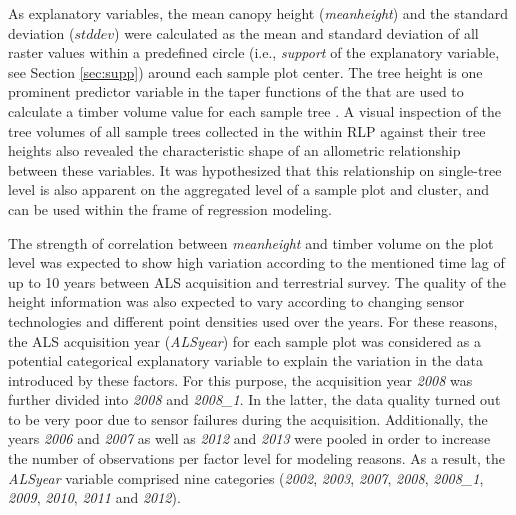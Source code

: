 As explanatory variables, the mean canopy height (\textit{meanheight}) and the standard deviation ($stddev$) were calculated as the mean and standard deviation of all raster values within a predefined circle (i.e., \textit{support} of the explanatory variable, see Section \ref{sec:supp}) around each sample plot center.  The tree height is one prominent predictor variable in the taper functions of the \bwi{} that are used to calculate a timber volume value for each sample tree \citep{kublin2003, kublin2013}. A visual inspection of the tree volumes of all sample trees collected in the \bwi{} within RLP against their tree heights also revealed the characteristic shape of an allometric relationship between these variables. It was hypothesized that this relationship on single-tree level is also apparent on the aggregated level of a sample plot and cluster, and can be used within the frame of regression modeling.\par
The strength of correlation between \textit{meanheight} and timber volume on the plot level was expected to show high variation according to the mentioned time lag of up to 10 years between ALS acquisition and terrestrial survey. The quality of the height information was also expected to vary according to changing sensor technologies and different point densities used over the years. For these reasons, the ALS acquisition year (\textit{ALSyear}) for each sample plot was considered as a potential categorical explanatory variable to explain the variation in the data introduced by these factors. For this purpose, the acquisition year \textit{2008} was further divided into \textit{2008} and \textit{2008\_1}. In the latter, the data quality turned out to be very poor due to sensor failures during the acquisition. Additionally, the years \textit{2006} and \textit{2007} as well as \textit{2012} and \textit{2013} were pooled in order to increase the number of observations per factor level for modeling reasons. As a result, the \textit{ALSyear} variable comprised nine categories (\textit{2002}, \textit{2003}, \textit{2007}, \textit{2008}, \textit{2008\_1}, \textit{2009}, \textit{2010}, \textit{2011} and \textit{2012}).

